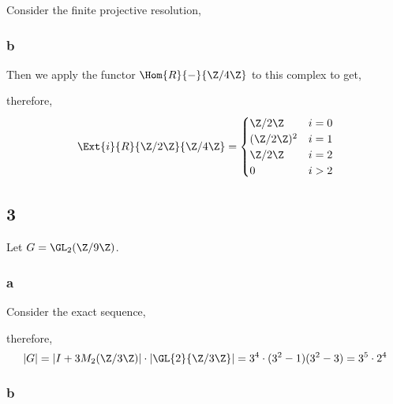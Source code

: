 \documentclass[12pt]{article}
\begin{document}
Consider the finite projective resolution,
\begin{center}
\end{center}

\subsubsection{b}

Then we apply the functor $\Hom{R}{-}{\Z/4\Z}$ to this complex to get,
\begin{center}
\end{center}
therefore,
\[ \Ext{i}{R}{\Z / 2 \Z}{\Z / 4 \Z} = 
\begin{cases}
\Z / 2 \Z & i = 0
\\
(\Z / 2 \Z)^2 & i = 1
\\
\Z / 2 \Z & i = 2
\\
0 & i > 2
\end{cases} \]



\subsection{3}

Let $G = \GL_2(\Z/9\Z)$.

\subsubsection{a}

Consider the exact sequence,
\begin{center}
\end{center}
therefore,
\[ |G| = |I + 3 M_2(\Z/3\Z)| \cdot |\GL{2}{\Z / 3 \Z}| = 3^4 \cdot (3^2 - 1)(3^2 - 3) = 3^5 \cdot 2^4 \]

\subsubsection{b}
\end{document}
